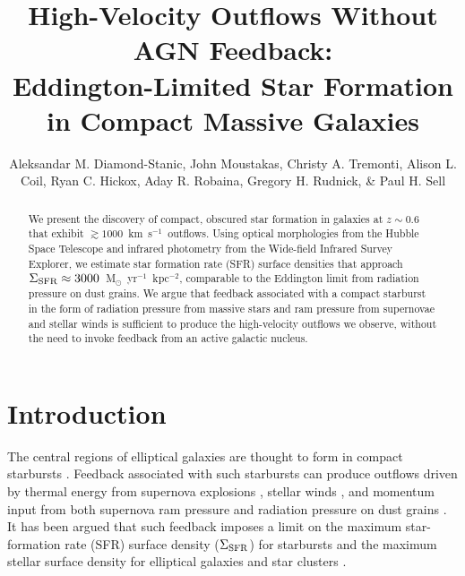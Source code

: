 \documentclass[apj]{emulateapj}
\newcommand{\kms}{km~s$^{-1}$}
\newcommand{\units}{M$_{\odot}$~yr$^{-1}$~kpc$^{-2}$}
\newcommand{\sigmasfr}{\Sigma_{\textnormal{\scriptsize{SFR}}}}
\begin{document}
\title{High-Velocity Outflows Without AGN Feedback:
  \\ Eddington-Limited Star Formation in Compact Massive Galaxies}

\author{Aleksandar M. Diamond-Stanic, John
  Moustakas, Christy A. Tremonti,
  Alison L. Coil, Ryan C. Hickox, Aday
  R. Robaina, Gregory H. Rudnick, \&
  Paul H. Sell }




\begin{abstract}

We present the discovery of compact, obscured star formation in
galaxies at $z\sim0.6$ that exhibit $\gtrsim1000$~\kms\ outflows.
Using optical morphologies from the Hubble Space Telescope and
infrared photometry from the Wide-field Infrared Survey Explorer, we
estimate star formation rate (SFR) surface densities that approach
$\sigmasfr\approx3000$~\units, comparable to the Eddington limit from
radiation pressure on dust grains.  We argue that feedback associated
with a compact starburst in the form of radiation pressure from
massive stars and ram pressure from supernovae and stellar winds is
sufficient to produce the high-velocity outflows we observe, without
the need to invoke feedback from an active galactic nucleus.

\end{abstract}


\section{Introduction}

The central regions of elliptical galaxies are thought to form in
compact starbursts \citep{kor09,hop09}.  Feedback associated with such
starbursts can produce outflows driven by thermal energy from
supernova explosions \citep{che85}, stellar winds \citep{lei92}, and
momentum input from both supernova ram pressure and radiation pressure
on dust grains \citep{mur05}.  It has been argued that such feedback
imposes a limit on the maximum star-formation rate (SFR) surface
density ($\sigmasfr$) for starbursts \citep{leh96,meu97,mur05,tho05}
and the maximum stellar surface density for elliptical galaxies and
star clusters \citep{hop10}.
\end{document}
